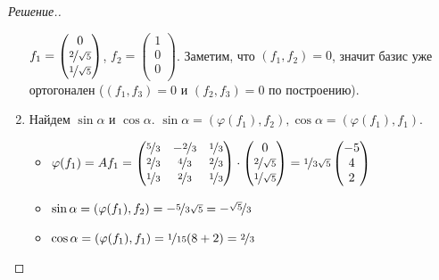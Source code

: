 \documentclass[a4paper]{article}
\theoremstyle{remark}
\begin{document}
\begin{proof}[Решение.]
\begin{enumerate}
                $f_1 = \begin{pmatrix}
                    0 \\
                    \nicefrac2{\sqrt{5}} \\
                    \nicefrac1{\sqrt{5}}\\
                \end{pmatrix}$, $f_2 = \begin{pmatrix}
                    1 \\
                    0 \\
                    0\\
                \end{pmatrix}$. Заметим, что $(f_1, f_2) = 0$, значит базис уже ортогонален 
                ($(f_1, f_3) = 0$ и $(f_2, f_3) = 0$ по построению).
                \item Найдем $\sin \alpha$ и $\cos \alpha$. $\sin \alpha = (\varphi(f_1), f_2), 
                \cos \alpha = (\varphi(f_1), f_1)$.
                \begin{itemize}
                    \item $\varphi(f_1) = Af_1 = 
                    \begin{pmatrix}
                        \nicefrac53 & -\nicefrac23 & \nicefrac13 \\
                        \nicefrac23 & \nicefrac43 & \nicefrac23 \\
                        \nicefrac13 & \nicefrac23 & \nicefrac13 \\
                    \end{pmatrix} 
                    \cdot 
                    \begin{pmatrix}
                        0 \\
                        \nicefrac2{\sqrt{5}} \\
                        \nicefrac1{\sqrt{5}}\\
                    \end{pmatrix} = 
                    \nicefrac{1}{3\sqrt{5}}
                    \begin{pmatrix}
                        -5 \\
                        4 \\
                        2\\
                    \end{pmatrix}$
                    \item $\sin \alpha = (\varphi(f_1), f_2) = -\nicefrac{5}{3\sqrt{5}} = -\nicefrac{\sqrt{5}}{3}$
                    \item $\cos \alpha = (\varphi(f_1), f_1) = \nicefrac{1}{15}(8 + 2) = \nicefrac23$
                \end{itemize}


\end{enumerate}
\end{proof}
\end{document}
